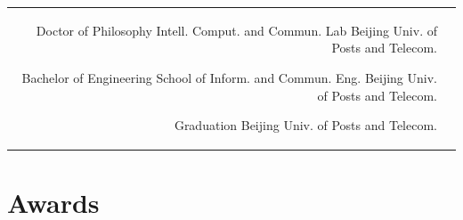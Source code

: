 \documentclass[10pt]{article} %
\begin{document}
\begin{paracol}{2}

\begin{supertabular}{rl} %

	
	{Doctor of Philosophy} %
	{} %
	{Intell. Comput. and Commun. Lab} %
	{Beijing Univ. of Posts and Telecom.} %
	
	
	{Bachelor of Engineering} %
	{} %
	{School of Inform. and Commun. Eng.} %
	{Beijing Univ. of Posts and Telecom.} %
	
	{Graduation}%
	{} %
	{} %
	{Beijing Univ. of Posts and Telecom.} %
\end{supertabular}


\section{Awards}





\begin{supertabular}{rl} %
	
	

\end{supertabular}
\end{paracol}
\end{document}

